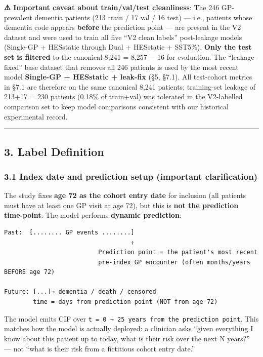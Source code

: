 \documentclass[
  11pt,
]{article}
\newcommand{\passthrough}[1]{#1}
\begin{document}
\textbf{⚠️ Important caveat about train/val/test cleanliness}: The 246
GP-prevalent dementia patients (213 train / 17 val / 16 test) --- i.e.,
patients whose dementia code appears \textbf{before} the prediction
point --- are present in the V2 dataset and were used to train all five
``V2 clean labels'' post-leakage models (Single-GP + HESstatic through
Dual + HESstatic + SST5\%). \textbf{Only the test set is filtered} to
the canonical 8,241 = 8,257 − 16 for evaluation. The ``leakage-fixed''
base dataset that removes all 246 patients is used by the most recent
model \textbf{Single-GP + HESstatic + leak-fix} (§5, §7.1). All
test-cohort metrics in §7.1 are therefore on the same canonical 8,241
patients; training-set leakage of 213+17 = 230 patients (0.18\% of
train+val) was tolerated in the V2-labelled comparison set to keep model
comparisons consistent with our historical experimental record.

\begin{center}\rule{0.5\linewidth}{0.5pt}\end{center}

\subsection{3. Label Definition}\label{label-definition}

\subsubsection{3.1 Index date and prediction setup (important
clarification)}\label{index-date-and-prediction-setup-important-clarification}

The study fixes \textbf{age 72 as the cohort entry date} for inclusion
(all patients must have at least one GP visit at age 72), but this is
\textbf{not the prediction time-point}. The model performs
\textbf{dynamic prediction}:

\begin{lstlisting}
Past:  [........ GP events ........]
                                   ↑
                          Prediction point = the patient's most recent
                          pre-index GP encounter (often months/years BEFORE age 72)

Future: [...]→ dementia / death / censored
        time = days from prediction point (NOT from age 72)
\end{lstlisting}

The model emits CIF over
\passthrough{\lstinline!t = 0 → 25 years from the prediction point!}.
This matches how the model is actually deployed: a clinician asks
``given everything I know about this patient up to today, what is their
risk over the next N years?'' --- not ``what is their risk from a
fictitious cohort entry date.''
\end{document}
